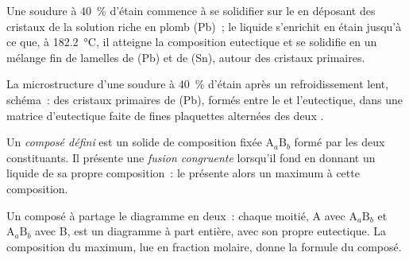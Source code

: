 Une soudure à 40~\% d'étain commence à se solidifier sur le  en déposant des cristaux de
la solution riche en plomb (Pb)~; le liquide s'enrichit en étain jusqu'à ce que, à
\qty{182.2}{\degreeCelsius}, il atteigne la composition eutectique et se solidifie en
un mélange fin de lamelles de (Pb) et de (Sn), autour des cristaux primaires.

\begin{omfigure}

{\small La microstructure d'une soudure à 40~\% d'étain après un refroidissement lent, schéma~:
des cristaux primaires de (Pb), formés entre le  et l'eutectique, dans une
matrice d'eutectique faite de fines plaquettes alternées des deux .}
\end{omfigure}

\begin{definition}\label{def:b2:solid-liquid-diagrams:defined-compound}
Un \emph{composé défini} est un solide de
composition fixée $\mathrm{A}_a\mathrm{B}_b$ formé par les deux constituants. Il présente
une \emph{fusion congruente} lorsqu'il fond en donnant un liquide de
sa propre composition~: le  présente alors un maximum à cette composition.
\end{definition}

Un composé à  partage le diagramme en deux~: chaque moitié, A avec
$\mathrm{A}_a\mathrm{B}_b$ et $\mathrm{A}_a\mathrm{B}_b$ avec B, est un diagramme à
part entière, avec son propre eutectique. La composition du maximum, lue en fraction
molaire, donne la formule du composé.

